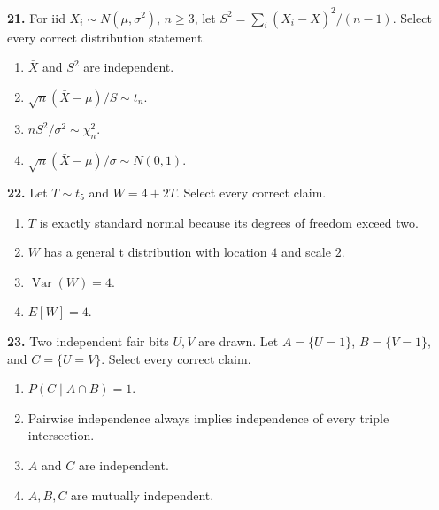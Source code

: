 \documentclass[11pt,a4paper]{article}
\begin{document}
\par\noindent\begin{minipage}{\linewidth}
\textbf{21.} For iid \(X_i\sim N(\mu,\sigma^2)\), \(n\ge3\), let \(S^2=\sum_i(X_i-\bar X)^2/(n-1)\). Select every correct distribution statement.
\begin{enumerate}[label=(\Alph*),leftmargin=8mm,itemsep=2pt,topsep=2pt]
\item \(\bar X\) and \(S^2\) are independent.
\item \(\sqrt n(\bar X-\mu)/S\sim t_n\).
\item \(nS^2/\sigma^2\sim\chi^2_n\).
\item \(\sqrt n(\bar X-\mu)/\sigma\sim N(0,1)\).
\end{enumerate}

\end{minipage}\par\vspace{3mm}
\par\noindent\begin{minipage}{\linewidth}
\textbf{22.} Let \(T\sim t_5\) and \(W=4+2T\). Select every correct claim.
\begin{enumerate}[label=(\Alph*),leftmargin=8mm,itemsep=2pt,topsep=2pt]
\item \(T\) is exactly standard normal because its degrees of freedom exceed two.
\item \(W\) has a general t distribution with location \(4\) and scale \(2\).
\item \(\operatorname{Var}(W)=4\).
\item \(E[W]=4\).
\end{enumerate}

\end{minipage}\par\vspace{3mm}
\par\noindent\begin{minipage}{\linewidth}
\textbf{23.} Two independent fair bits \(U,V\) are drawn. Let \(A=\{U=1\}\), \(B=\{V=1\}\), and \(C=\{U=V\}\). Select every correct claim.
\begin{enumerate}[label=(\Alph*),leftmargin=8mm,itemsep=2pt,topsep=2pt]
\item \(P(C\mid A\cap B)=1\).
\item Pairwise independence always implies independence of every triple intersection.
\item \(A\) and \(C\) are independent.
\item \(A,B,C\) are mutually independent.
\end{enumerate}

\end{minipage}\par\vspace{3mm}
\end{document}
